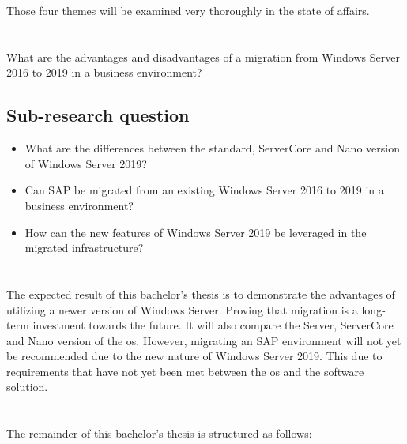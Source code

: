 Those four themes will be examined very thoroughly in the state of affairs.

\section{}
\label{sec:onderzoeksvraag}
What are the advantages and disadvantages of a migration from Windows Server 2016 to 2019 in a business environment?

\subsection{Sub-research question}

\begin{itemize}
	\item What are the differences between the standard, ServerCore and Nano version of Windows Server 2019?
	\item Can SAP be migrated from an existing Windows Server 2016 to 2019 in a business environment?
	\item How can the new features of Windows Server 2019 be leveraged in the migrated infrastructure? 
\end{itemize}

\section{}
\label{sec:onderzoeksdoelstelling}

The expected result of this bachelor's thesis is to demonstrate the advantages of utilizing a newer version of Windows Server. Proving that migration is a long-term investment towards the future. It will also compare the Server, ServerCore and Nano version of the \acrshort{os}. However, migrating an SAP environment will not yet be recommended due to the new nature of Windows Server 2019. This due to requirements that have not yet been met between the \acrshort{os} and the software solution. 

\section{}
\label{sec:opzet-bachelorproef}

The remainder of this bachelor's thesis is structured as follows:


